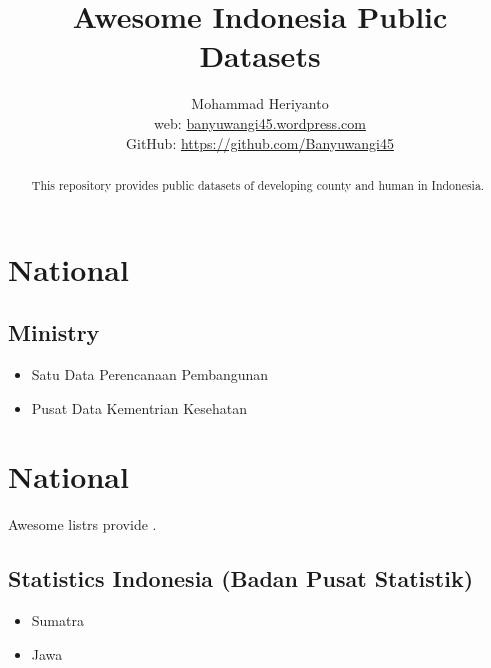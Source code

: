 \documentclass[12pt,oneside,a4paper]{article}
\begin{document}
\title{Awesome Indonesia Public Datasets}
\author{Mohammad Heriyanto \\web: \href{https://banyuwangi45.wordpress.com/}{banyuwangi45.wordpress.com} \\ GitHub: \href{https://github.com/Banyuwangi45/Awesome-Public-Datasets}{https://github.com/Banyuwangi45}}
   
\maketitle

\begin{abstract}
This repository provides public datasets of developing county and human in Indonesia.
\end{abstract}

\section{National}
\subsection{Ministry}
\begin{itemize}
\item Satu Data Perencanaan Pembangunan 
\item Pusat Data Kementrian Kesehatan
\end{itemize}


\section{National}
Awesome listrs provide .

\subsection{Statistics Indonesia (Badan Pusat Statistik)}
\begin{itemize}
\item Sumatra
\item Jawa
\end{itemize}
\end{document}
